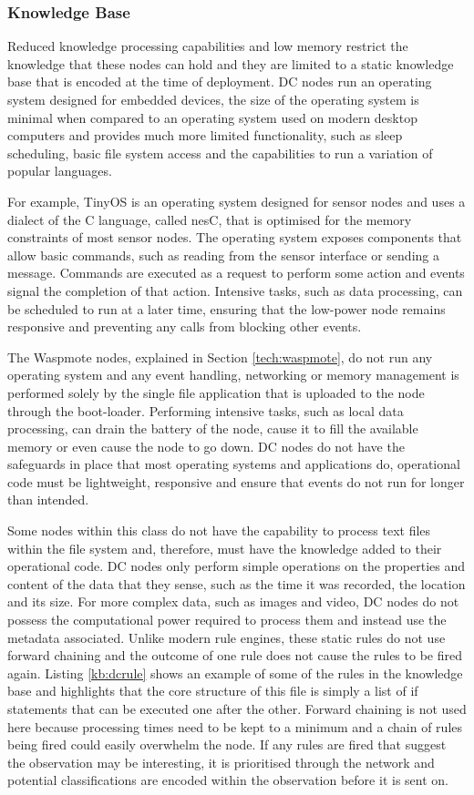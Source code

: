 	\subsubsection{Knowledge Base}
	Reduced knowledge processing capabilities and low memory restrict the knowledge that these nodes can hold and they are limited to a static knowledge base that is encoded at the time of 	deployment. DC nodes run an operating system designed for embedded devices, the size of the operating system is minimal when compared to an operating system used on modern desktop computers and provides much more limited functionality, such as sleep scheduling, basic file system access and the capabilities to run a variation of popular languages. 

	For example, TinyOS \cite{levis2005} is an operating system designed for sensor nodes and uses a dialect of the C language, called nesC, that is optimised for the memory constraints of most sensor nodes. The operating system exposes components that allow basic commands, such as reading from the sensor interface or sending a message. Commands are executed as a request to perform some action and events signal the completion of that action. Intensive tasks, such as data processing, can be scheduled to run at a later time, ensuring that the low-power node remains responsive and preventing any calls from blocking other events.

	The Waspmote nodes, explained in Section \ref{tech:waspmote}, do not run any operating system and any event handling, networking or memory management is performed solely by the single file application that is uploaded to the node through the boot-loader. Performing intensive tasks, such as local data processing, can drain the battery of the node, cause it to fill the available memory or even cause the node to go down. DC nodes do not have the safeguards in place that most operating systems and applications do, operational code must be lightweight, responsive and ensure that events do not run for longer than intended. 

	Some nodes within this class do not have the capability to process text files within the file system and, therefore, must have the knowledge added to their operational code. DC nodes only perform simple operations on the properties and content of the data that they sense, such as the time it was recorded, the location and its size. For more complex data, such as images and video, DC nodes do not possess the computational power required to process them and instead use the metadata associated.
	Unlike modern rule engines, these static rules do not use forward chaining and the outcome of one rule does not cause the rules to be fired again. Listing \ref{kb:dcrule} shows an example of some of the rules in the knowledge base and highlights that the core structure of this file is simply a list of if statements that can be executed one after the other. Forward chaining is not used here because processing times need to be kept to a minimum and a chain of rules being fired could easily overwhelm the node. If any rules are fired that suggest the observation may be interesting, it is prioritised through the network and potential classifications are encoded within the observation before it is sent on.

